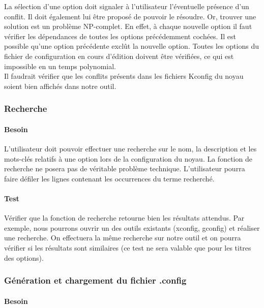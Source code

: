 \documentclass[16pts]{report}
\begin{document}
La sélection d’une option doit signaler à l’utilisateur l’éventuelle présence
d’un conflit. Il doit également lui être proposé de pouvoir le résoudre. Or,
trouver une solution est un problème NP-complet. En effet, à chaque nouvelle
option il faut vérifier les dépendances de toutes les options précédemment
cochées. Il est possible qu’une option précédente exclût la nouvelle option.
Toutes les options du fichier de configuration en cours d’édition doivent être
vérifiées, ce qui est impossible en un temps polynomial.
\\

Il faudrait vérifier que les conflits présents dans les fichiers Kconfig du
noyau soient bien affichés dans notre outil.


\subsubsection{Recherche}
\label{sec:Recherche}
\paragraph{Besoin}
\label{sub:Besoin}

L’utilisateur doit pouvoir effectuer une recherche sur le nom, la description
et les mots-clés relatifs à une option lors de la configuration du noyau. La
fonction de recherche ne posera pas de véritable problème technique.
L’utilisateur pourra faire défiler les lignes contenant les occurrences du
terme recherché.

\paragraph{Test}
\label{sub:Test}

Vérifier que la fonction de recherche retourne bien les résultats attendus. Par
exemple, nous pourrons ouvrir un des outils existants (xconfig, gconfig) et
réaliser une recherche. On effectuera la même recherche sur notre outil et on
pourra vérifier si les résultats sont similaires (ce test ne sera valable que
pour les titres des options).


\subsubsection{Génération et chargement du fichier .config}
\label{sec:Génération et chargement du fichier .config}
\paragraph{Besoin}
\label{sub:Besoin}
\end{document}
